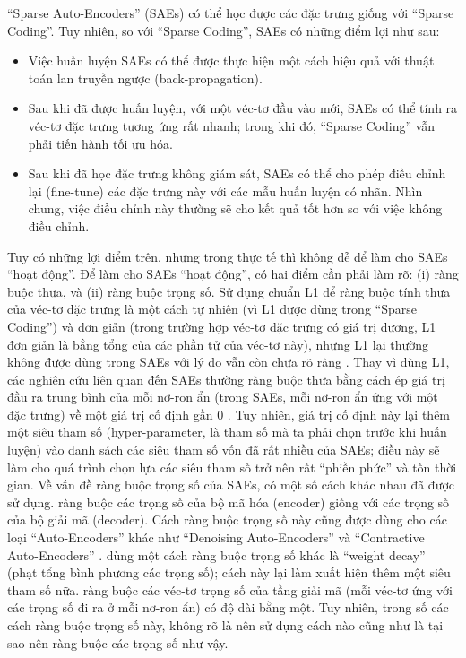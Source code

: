 ``Sparse Auto-Encoders'' (SAEs) có thể học được các đặc trưng giống với ``Sparse Coding''. Tuy nhiên, so với ``Sparse Coding'', SAEs có những điểm lợi như sau:
\begin{itemize}
	\item Việc huấn luyện SAEs có thể được thực hiện một cách hiệu quả với thuật toán lan truyền ngược (back-propagation).
	\item Sau khi đã được huấn luyện, với một véc-tơ đầu vào mới, SAEs có thể tính ra véc-tơ đặc trưng tương ứng rất nhanh; trong khi đó, ``Sparse Coding'' vẫn phải tiến hành tối ưu hóa.
	\item Sau khi đã học đặc trưng không giám sát, SAEs có thể cho phép điều chỉnh lại (fine-tune) các đặc trưng này với các mẫu huấn luyện có nhãn. Nhìn chung, việc điều chỉnh này thường sẽ cho kết quả tốt hơn so với việc không điều chỉnh.
\end{itemize}

Tuy có những lợi điểm trên, nhưng trong thực tế thì không dễ để làm cho SAEs ``hoạt động''. Để làm cho SAEs ``hoạt động'', có hai điểm cần phải làm rõ: (i) ràng buộc thưa, và (ii) ràng buộc trọng số. Sử dụng chuẩn L1 để ràng buộc tính thưa của véc-tơ đặc trưng là một cách tự nhiên (vì L1 được dùng trong ``Sparse Coding'') và đơn giản (trong trường hợp véc-tơ đặc trưng có giá trị dương, L1 đơn giản là bằng tổng của các phần tử của véc-tơ này), nhưng L1 lại thường không được dùng trong SAEs với lý do vẫn còn chưa rõ ràng \cite{bengio2013representation}. Thay vì dùng L1, các nghiên cứu liên quan đến SAEs thường ràng buộc thưa bằng cách ép giá trị đầu ra trung bình của mỗi nơ-ron ẩn (trong SAEs, mỗi nơ-ron ẩn ứng với một đặc trưng) về một giá trị cố định gần 0 \cite{goodfellow2009measuring}\cite{coates2011analysis}\cite{coates2012demystifying}. Tuy nhiên, giá trị cố định này lại thêm một siêu tham số (hyper-parameter, là tham số mà ta phải chọn trước khi huấn luyện) vào danh sách các siêu tham số vốn đã rất nhiều của SAEs; điều này sẽ làm cho quá trình chọn lựa các siêu tham số trở nên rất ``phiền phức'' và tốn thời gian. Về vấn đề ràng buộc trọng số của SAEs, có một số cách khác nhau đã được sử dụng. \cite{coates2012demystifying} ràng buộc các trọng số của bộ mã hóa (encoder) giống với các trọng số của bộ giải mã (decoder). Cách ràng buộc trọng số này cũng được dùng cho các loại ``Auto-Encoders'' khác như ``Denoising Auto-Encoders'' \cite{vincent2008extracting} và ``Contractive Auto-Encoders'' \cite{rifai2011contractive}\cite{rifai2011HCAEs}. \cite{goodfellow2009measuring}\cite{coates2011analysis} dùng một cách ràng buộc trọng số khác là ``weight decay'' (phạt tổng bình phương các trọng số); cách này lại làm xuất hiện thêm một siêu tham số nữa. \cite{zeiler2013rectified} ràng buộc các véc-tơ trọng số của tầng giải mã (mỗi véc-tơ ứng với các trọng số đi ra ở mỗi nơ-ron ẩn) có độ dài bằng một. Tuy nhiên, trong số các cách ràng buộc trọng số này, không rõ là nên sử dụng cách nào cũng như là tại sao nên ràng buộc các trọng số như vậy.

